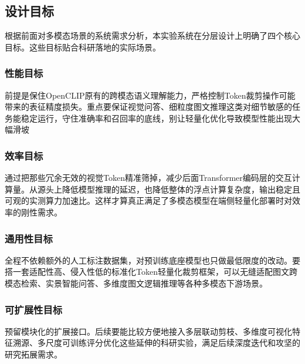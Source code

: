 \documentclass{article}
\begin{document}
{{{{{{{{{{{{{		\subsection{设计目标}
		{\setlength{\parindent}{2em}\setlength{\baselineskip}{20pt}\selectfont
			根据前面对多模态场景的系统需求分析，本实验系统在分层设计上明确了四个核心目标。这些目标贴合科研落地的实际场景。
			\subsubsection{性能目标}
			{\setlength{\parindent}{2em}\setlength{\baselineskip}{20pt}\selectfont
				前提是保住OpenCLIP原有的跨模态语义理解能力，严格控制Token裁剪操作可能带来的表征精度损失。重点要保证视觉问答、细粒度图文推理这类对细节敏感的任务能稳定运行，守住准确率和召回率的底线，别让轻量化优化导致模型性能出现大幅滑坡
			\subsubsection{效率目标}
			{\setlength{\parindent}{2em}\setlength{\baselineskip}{20pt}\selectfont
				通过把那些冗余无效的视觉Token精准筛掉，减少后面Transformer编码层的交互计算量。从源头上降低模型推理的延迟，也降低整体的浮点计算复杂度，输出稳定且可观的实测算力加速比。这样才算真正满足了多模态模型在端侧轻量化部署时对效率的刚性需求。
			\subsubsection{通用性目标}
			{\setlength{\parindent}{2em}\setlength{\baselineskip}{20pt}\selectfont
				全程不依赖额外的人工标注数据集，对预训练底座模型也只做最低限度的改动。要搭一套适配性高、侵入性低的标准化Token轻量化裁剪框架，可以无缝适配图文跨模态检索、实景智能问答、多维度图文逻辑推理等各种多模态下游场景。
			\subsubsection{可扩展性目标}
			{\setlength{\parindent}{2em}\setlength{\baselineskip}{20pt}\selectfont
				预留模块化的扩展接口。后续要能比较方便地接入多层联动剪枝、多维度可视化特征溯源、多尺度可训练评分优化这些延伸的科研实验，满足后续深度迭代和攻坚的研究拓展需求。
}}}}}}}}}}}}}}}}}}
\end{document}
